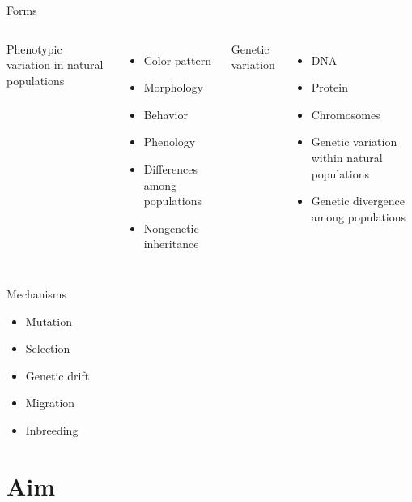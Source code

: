 \documentclass[
  ignorenonframetext,
  aspectratio=169]{beamer}
\providecommand{\tightlist}{%
  \setlength{\itemsep}{0pt}\setlength{\parskip}{0pt}}
\begin{document}
\begin{frame}{Forms}
\protect\hypertarget{forms}{}
\begin{columns}[T,onlytextwidth]
  
  \alert{Phenotypic variation in natural populations}
  \begin{itemize}
  \item Color pattern
  \item Morphology
  \item Behavior
  \item Phenology
  \item Differences among populations
  \item Nongenetic inheritance
  \end{itemize}

  \alert{Genetic variation}
  \begin{itemize}
  \item DNA
  \item Protein
  \item Chromosomes
  \item Genetic variation within natural populations
  \item Genetic divergence among populations
  \end{itemize}

\end{columns}
\end{frame}

\begin{frame}{Mechanisms}
\protect\hypertarget{mechanisms}{}
\begin{itemize}
\tightlist
\item
  Mutation
\item
  Selection
\item
  Genetic drift
\item
  Migration
\item
  Inbreeding
\end{itemize}
\end{frame}

\hypertarget{aim}{%
\section{Aim}\label{aim}}
\end{document}
